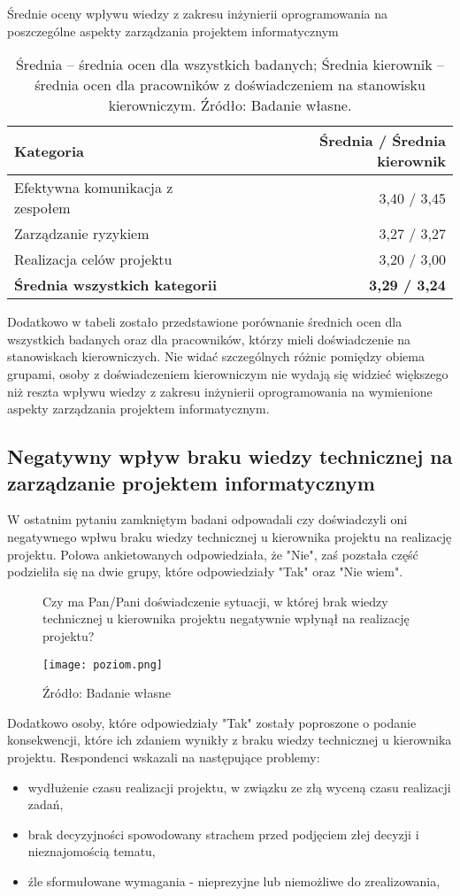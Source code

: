\begin{table}[h]
\centering
\caption{Średnie oceny wpływu wiedzy z zakresu inżynierii oprogramowania na poszczególne aspekty zarządzania projektem informatycznym}
\begin{tabular}{p{10cm} r}
\toprule
\textbf{Kategoria} & \textbf{Średnia / Średnia kierownik} \\
\midrule
Efektywna komunikacja z zespołem & 3{,}40 / 3{,}45 \\
Zarządzanie ryzykiem & 3{,}27 / 3{,}27 \\
Realizacja celów projektu & 3{,}20 / 3{,}00 \\
\textbf{Średnia wszystkich kategorii} & \textbf{3{,}29 / 3{,}24} \\  
\bottomrule
\end{tabular}
\caption*{Średnia – średnia ocen dla wszystkich badanych; Średnia kierownik – średnia ocen dla pracowników z doświadczeniem na stanowisku kierowniczym. Źródło: Badanie własne.}
\end{table}

Dodatkowo w tabeli zostało przedstawione porównanie średnich ocen dla wszystkich badanych oraz dla pracowników, którzy mieli doświadczenie na stanowiskach kierowniczych. Nie widać szczególnych różnic pomiędzy obiema grupami, osoby z doświadczeniem kierowniczym nie wydają się widzieć większego niż reszta wpływu wiedzy z zakresu inżynierii oprogramowania na wymienione aspekty zarządzania projektem informatycznym. 

\subsection{Negatywny wpływ braku wiedzy technicznej na zarządzanie projektem informatycznym}
W ostatnim pytaniu zamkniętym badani odpowadali czy doświadczyli oni negatywnego wpłwu braku wiedzy technicznej u kierownika projektu na realizację projektu. Połowa ankietowanych odpowiedziała, że "Nie", zaś pozstała część podzieliła się na dwie grupy, które odpowiedziały "Tak" oraz "Nie wiem". 

\begin{figure}
  \caption{Czy ma Pan/Pani doświadczenie sytuacji, w której brak wiedzy technicznej u kierownika projektu negatywnie wpłynął na realizację projektu?}
  \centering
  \texttt{[image: poziom.png]}
  \caption*{Źródło: Badanie własne}
\end{figure}

Dodatkowo osoby, które odpowiedziały "Tak" zostały poproszone o podanie konsekwencji, które ich zdaniem wynikły z braku wiedzy technicznej u kierownika projektu. Respondenci wskazali na następujące problemy:
\begin{itemize}
  \item wydłużenie czasu realizacji projektu, w związku ze złą wyceną czasu realizacji zadań,
  \item brak decyzyjności spowodowany strachem przed podjęciem złej decyzji i nieznajomością tematu,
  \item źle sformułowane wymagania - nieprezyjne lub niemożliwe do zrealizowania,
\end{itemize}

